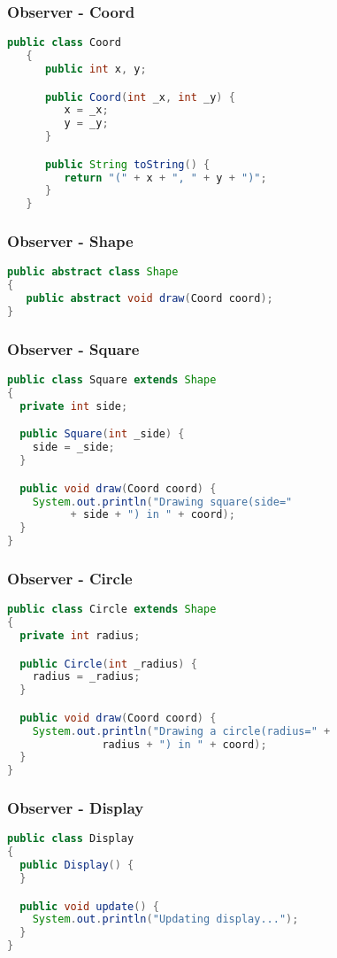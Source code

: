 \documentclass[11pt]{beamer}
\begin{document}
\begin{frame}[fragile]
   \frametitle{Observer - Coord}
   {\small
   \begin{lstlisting}[language=java]
   public class Coord
   {
      public int x, y;

      public Coord(int _x, int _y) {
         x = _x;
         y = _y;
      }

      public String toString() {
         return "(" + x + ", " + y + ")";
      }
   }
   \end{lstlisting}}
\end{frame}

\begin{frame}[fragile]
   \frametitle{Observer - Shape}
   {\footnotesize
      \begin{lstlisting}[language=java]
public abstract class Shape
{
   public abstract void draw(Coord coord);
}
      \end{lstlisting}
   }
\end{frame}

\begin{frame}[fragile]
   \frametitle{Observer - Square}
   {\footnotesize
   \begin{lstlisting}[language=java]
public class Square extends Shape
{
  private int side;

  public Square(int _side) {
    side = _side;
  }

  public void draw(Coord coord) {
    System.out.println("Drawing square(side="
          + side + ") in " + coord);
  }
}
   \end{lstlisting}
   }
\end{frame}

\begin{frame}[fragile]
   \frametitle{Observer - Circle}
   {\footnotesize
   \begin{lstlisting}[language=java]
public class Circle extends Shape
{
  private int radius;

  public Circle(int _radius) {
    radius = _radius;
  }

  public void draw(Coord coord) {
    System.out.println("Drawing a circle(radius=" +
               radius + ") in " + coord);
  }
}
   \end{lstlisting}
   }
\end{frame}

\begin{frame}[fragile]
   \frametitle{Observer - Display}
   {\footnotesize
   \begin{lstlisting}[language=java]
public class Display
{
  public Display() {
  }

  public void update() {
    System.out.println("Updating display...");
  }
}
   \end{lstlisting}
   }
\end{frame}
\end{document}
